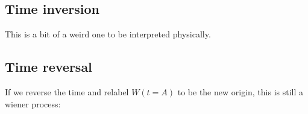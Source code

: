 \documentclass{report}
\begin{document}
\subsection{Time inversion}
This is a bit of a weird one to be interpreted physically.
\subsection{Time reversal}
If we reverse the time and relabel $W(t=A)$ to be the new origin, this is still a wiener process:
\end{document}
